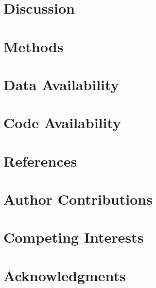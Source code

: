 \documentclass{article}
\begin{document}
\section{Discussion}
\section{Methods}
\section{Data Availability}
\section{Code Availability}
\section{References}
\section{Author Contributions}
\section{Competing Interests}
\section{Acknowledgments}
\end{document}
